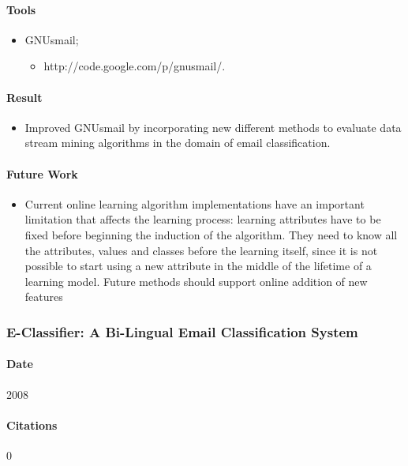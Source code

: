 \documentclass[12pt]{article}
\begin{document}
\paragraph{Tools}
\begin{itemize}
    \item GNUsmail;
    \begin{itemize}
        \item http://code.google.com/p/gnusmail/.
    \end{itemize}
\end{itemize}

\paragraph{Result}
\begin{itemize}
\item Improved GNUsmail by incorporating new different methods to evaluate data stream mining algorithms in the domain of email classification.
\end{itemize}

\paragraph{Future Work}
\begin{itemize}
\item Current online learning algorithm implementations have an important limitation that affects the learning process: learning attributes have to be fixed before beginning the induction of the algorithm. They need to know all the attributes, values and classes before the learning itself, since it is not possible to start using a new attribute in the middle of the lifetime of a learning model. Future methods should support online addition of new features
\end{itemize}




\subsubsection{E-Classifier: A Bi-Lingual Email Classification System}
\paragraph{Date} 2008
\paragraph{Citations} 0
\end{document}
